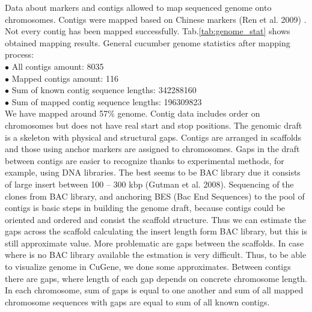 \documentclass[]{spie}
\newcommand{\appName}{CuGene}
\begin{document}
Data about markers and contigs allowed to map sequenced genome onto chromosomes. Contigs were mapped based on Chinese markers (Ren et al. 2009) . Not every contig has been mapped successfully. Tab.\ref{tab:genome_stat} shows obtained mapping results.
General cucumber genome statistics after mapping process:\\
$\bullet$ All contigs amount: 8035 \\
$\bullet$ Mapped contigs amount: 116 \\
$\bullet$ Sum of known contig sequence lengths: 342288160 \\
$\bullet$ Sum of mapped contig sequence lengths: 196309823 \\
We have mapped around 57\% genome. Contig data includes order on chromosomes but does not have real start and stop positions. The genomic draft is a skeleton with physical and structural gaps. Contigs  are arranged in scaffolds and those using anchor markers are assigned to chromosomes. Gaps in the draft between contigs are easier to recognize thanks to experimental methods, for example, using DNA libraries. The best seems to be BAC library due it consists of large insert  between 100 – 300 kbp (Gutman et al. 2008). Sequencing of the clones from BAC library, and anchoring BES (Bac End Sequences) to the pool of contigs is basic steps in building the genome draft, because contigs could be oriented and ordered and consist the scaffold structure. Thus we can estimate the gaps across the scaffold calculating the insert length form BAC library, but this is still approximate value. More problematic are gaps between the scaffolds. In case where is no BAC library available the estmation is very difficult. Thus, to be able to visualize genome in \appName{}, we done some approximates. Between contigs there are gaps, where length of each gap depends on concrete chromosome length. In each chromosome, sum of gaps is equal to one another and sum of all mapped chromosome sequences with gaps are equal to sum of all known contigs.
\end{document}
